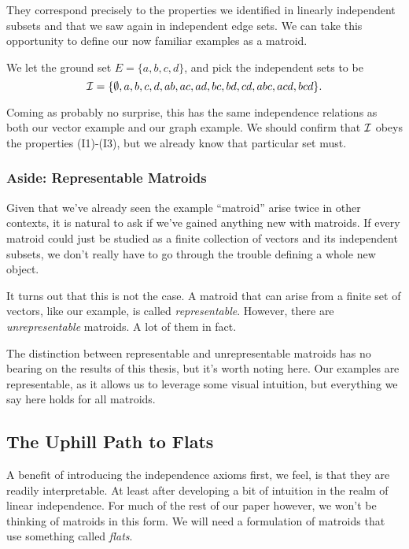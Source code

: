 \documentclass[12pt,oneside]{../../sfsuthesis}
\begin{document}
They correspond precisely to the properties we identified in linearly independent subsets and that we saw again in independent edge sets.
We can take this opportunity to define our now familiar examples as a matroid.
\begin{example}

    We let the ground set \( E = \{ a, b, c, d \} \), and pick the independent sets to be
    \[
        \mathcal{I} = \{
        \emptyset,
        a, b, c, d,
        ab, ac, ad, bc, bd, cd,
        abc, acd, bcd
        \}.
    \]

    Coming as probably no surprise, this has the same independence relations as both our vector example and our graph example.
    We should confirm that \( \mathcal{I} \) obeys the properties (I1)-(I3), but we already know that particular set must.

\end{example}



\subsubsection{Aside: Representable Matroids}
Given that we've already seen the example ``matroid'' arise twice in other contexts, it is natural to ask if we've gained anything new with matroids.
If every matroid could just be studied as a finite collection of vectors and its independent subsets, we don't really have to go through the trouble defining a whole new object.

It turns out that this is not the case.
A matroid that can arise from a finite set of vectors, like our example, is called \emph{representable}.
However, there are \emph{unrepresentable} matroids.
A lot of them in fact.

The distinction between representable and unrepresentable matroids has no bearing on the results of this thesis, but it's worth noting here.
Our examples are representable, as it allows us to leverage some visual intuition, but everything we say here holds for all matroids.

\subsection{The Uphill Path to Flats}

A benefit of introducing the independence axioms first, we feel, is that they are readily interpretable.
At least after developing a bit of intuition in the realm of linear independence.
For much of the rest of our paper however, we won't be thinking of matroids in this form.
We will need a formulation of matroids that use something called \emph{flats}.
\end{document}
